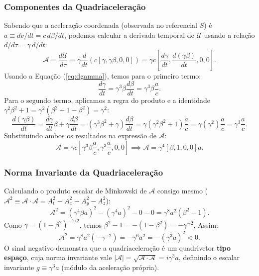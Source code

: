 \documentclass[11pt, a4paper]{article}
\begin{document}
\subsubsection{Componentes da Quadriaceleração}
Sabendo que a aceleração coordenada (observada no referencial $S$) é $a \equiv dv/dt = c \, d\beta/dt$, podemos calcular a derivada temporal de $\mathcal{U}$ usando a relação $d/d\tau = \gamma \, d/dt$:
\begin{equation}
\mathcal{A} = \frac{d\mathcal{U}}{d\tau} = \gamma \frac{d}{dt} \left( c [\gamma, \gamma \beta, 0, 0] \right) = \gamma c \left[ \frac{d\gamma}{dt}, \frac{d(\gamma \beta)}{dt}, 0, 0 \right].
\end{equation}
Usando a Equação (\ref{eq:dgamma}), temos para o primeiro termo:
\begin{equation}
\frac{d\gamma}{dt} = \gamma^3 \beta \frac{d\beta}{dt} = \gamma^3 \beta \frac{a}{c}.
\end{equation}
Para o segundo termo, aplicamos a regra do produto e a identidade $\gamma^2 \beta^2 + 1 = \gamma^2 (\beta^2 + 1 - \beta^2) = \gamma^2$:
\begin{equation}
\frac{d(\gamma \beta)}{dt} = \frac{d\gamma}{dt} \beta + \gamma \frac{d\beta}{dt} = \left( \gamma^3 \beta^2 + \gamma \right) \frac{d\beta}{dt} = \gamma (\gamma^2 \beta^2 + 1) \frac{a}{c} = \gamma (\gamma^2) \frac{a}{c} = \gamma^3 \frac{a}{c}.
\end{equation}
Substituindo ambos os resultados na expressão de $\mathcal{A}$:
\begin{equation}
\mathcal{A} = \gamma c \left[ \gamma^3 \beta \frac{a}{c}, \gamma^3 \frac{a}{c}, 0, 0 \right] \implies \mathcal{A} = \gamma^4 [\beta, 1, 0, 0] a. \label{eq:quad_a}
\end{equation}

\subsubsection{Norma Invariante da Quadriaceleração}
Calculando o produto escalar de Minkowski de $\mathcal{A}$ consigo mesmo ($\mathcal{A}^2 \equiv \mathcal{A} \cdot \mathcal{A} = A_t^2 - A_x^2 - A_y^2 - A_z^2$):
\begin{equation}
\mathcal{A}^2 = (\gamma^4 \beta a)^2 - (\gamma^4 a)^2 - 0 - 0 = \gamma^8 a^2 (\beta^2 - 1).
\end{equation}
Como $\gamma = (1 - \beta^2)^{-1/2}$, temos $\beta^2 - 1 = -(1 - \beta^2) = -\gamma^{-2}$. Assim:
\begin{equation}
\mathcal{A}^2 = \gamma^8 a^2 (-\gamma^{-2}) = -\gamma^6 a^2 = -(\gamma^3 a)^2 < 0.
\end{equation}
O sinal negativo demonstra que a quadriaceleração é um quadrivetor \textbf{tipo espaço}, cuja norma invariante vale $|\mathcal{A}| = \sqrt{\mathcal{A} \cdot \mathcal{A}} = i \gamma^3 a$, definindo o escalar invariante $g \equiv \gamma^3 a$ (módulo da aceleração própria).
\end{document}
